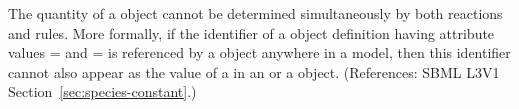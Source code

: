 The quantity of a \Species object cannot be determined simultaneously by
both reactions and rules.  More formally, if the identifier of a \Species
object definition having attribute values
= and = is
referenced by a \SpeciesReference object anywhere in a model, then this
identifier cannot also appear as the value of a  in an
\AssignmentRule or a \RateRule object.  (References: SBML L3V1
Section~\ref{sec:species-constant}.)
